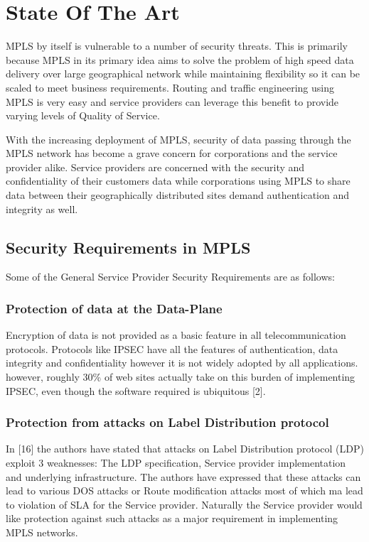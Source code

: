 \chapter{State Of The Art}
MPLS  by itself is vulnerable to a number of security threats. This is primarily because MPLS in its primary idea aims to solve the problem of high speed data delivery over large geographical network while maintaining flexibility so it can be scaled to meet business requirements. Routing and traffic engineering using MPLS is very easy and service providers can leverage this benefit to provide varying levels of Quality of Service.

With the increasing deployment of MPLS, security of data passing through the MPLS network has become a grave concern for corporations and the service provider alike. Service providers are concerned with the security and confidentiality of their customers data while corporations using MPLS to share data between their geographically distributed sites demand authentication and integrity as well.

\section{Security Requirements in MPLS}
Some of the General Service Provider Security Requirements are as follows:

\subsection*{Protection of data at the Data-Plane}
Encryption of data is not provided as a basic feature in all telecommunication protocols. Protocols like IPSEC have all the features of authentication, data integrity and confidentiality however it is not widely adopted by all applications. however, roughly 30\% of web sites actually take on this burden of implementing IPSEC, even though the software required is ubiquitous [2].

\subsection*{Protection from attacks on Label Distribution protocol}
In [16] the authors have stated that attacks on Label Distribution protocol (LDP) exploit 3 weaknesses: The LDP specification, Service provider implementation and underlying infrastructure. The authors have expressed that these attacks can lead to various DOS attacks or Route modification attacks most of which ma lead to violation of SLA for the Service provider. Naturally the Service provider would like protection against such attacks as a major requirement in implementing MPLS networks.

